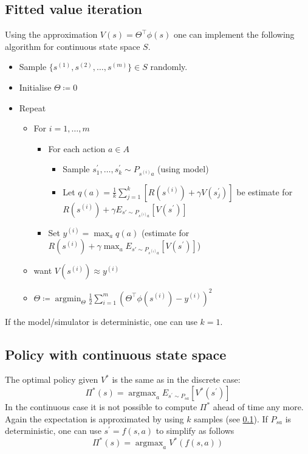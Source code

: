 \documentclass{article}
\begin{document}
\subsection{Fitted value iteration}\label{cha:fittedvi}
Using the approximation $V(s)=\Theta^\top\phi(s)$ one can implement the following algorithm for continuous state space $S$.
\begin{itemize}
  \item Sample $\{s^{(1)},s^{(2)},\ldots,s^{(m)}\}\in S$ randomly.
  \item Initialise $\Theta\coloneqq 0$
  \item Repeat
    \begin{itemize}
      \item For $i=1,\ldots,m$
        \begin{itemize}
          \item For each action $a\in A$
            \begin{itemize}
              \item Sample $s^\prime_1,\ldots,s^\prime_k\sim P_{s^{(i)}a}$ (using model)
              \item Let $q(a)=\frac{1}{k}\sum_{j=1}^k [R(s^{(i)})+\gamma V(s^\prime_j)]$
                be estimate for $R(s^{(i)})+\gamma E_{s\prime\sim P_{s^{(i)}a}}[V(s^\prime)]$
            \end{itemize}
          \item Set $y^{(i)}=\max_a q(a)$ (estimate for $R(s^{(i)})+\gamma\max_a E_{s\prime\sim P_{s^{(i)}a}}[V(s^\prime)]$)
        \end{itemize}
      \item want $V(s^{(i)})\approx y^{(i)}$
      \item $\Theta\coloneqq\mathop{\operatorname{argmin}}_\Theta\frac{1}{2}\sum_{i=1}^m(\Theta^\top\phi(s^{(i)})-y^{(i)})^2$
    \end{itemize}
\end{itemize}
If the model/simulator is deterministic, one can use $k=1$.

\subsection{Policy with continuous state space}
The optimal policy given $V^\ast$ is the same as in the discrete case:
\begin{equation}
  \Pi^\ast(s)=\mathop{\operatorname{argmax}}_a E_{s^\prime\sim P_{sa}}[V^\ast(s^\prime)]
\end{equation}
In the continuous case it is not possible to compute $\Pi^\ast$ ahead of time any more.
Again the expectation is approximated by using $k$ samples (see \cref{cha:fittedvi}).
If $P_{sa}$ is deterministic, one can use $s^\prime=f(s,a)$ to simplify as follows
\begin{equation}
  \Pi^\ast(s)=\mathop{\operatorname{argmax}}_a V^\ast(f(s,a))
\end{equation}
\end{document}
